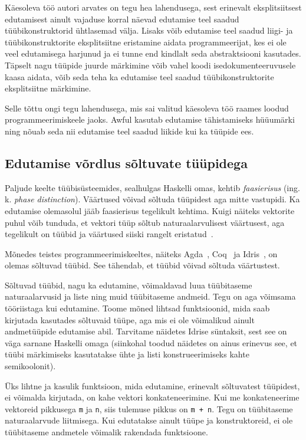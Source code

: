 \documentclass[12pt]{article}
\begin{document}
        Käesoleva töö autori arvates on tegu hea lahendusega, sest erinevalt eksplitsiitsest edutamisest ainult vajaduse korral näevad edutamise teel saadud tüübikonstruktorid ühtlasemad välja. Lisaks võib edutamise teel saadud liigi- ja tüübikonstruktorite eksplitsiitne eristamine aidata programmeerijat, kes ei ole veel edutamisega harjunud ja ei tunne end kindlalt seda abstraktsiooni kasutades. Täpselt nagu tüüpide juurde märkimine võib vahel koodi isedokumenteeruvusele kaasa aidata, võib seda teha ka edutamise teel saadud tüübikonstruktorite eksplitsiitne märkimine.

        Selle tõttu ongi tegu lahendusega, mis sai valitud käesoleva töö raames loodud programmeerimiskeele jaoks. Awful kasutab edutamise tähistamiseks hüüumärki ning nõuab seda nii edutamise teel saadud liikide kui ka tüüpide ees.
    \subsection{Edutamise võrdlus sõltuvate tüüpidega}\label{soltuvad}
      Paljude keelte tüübisüsteemides, sealhulgas Haskelli omas, kehtib \textit{faasierisus} (ing. k. \textit{phase distinction}). Väärtused võivad sõltuda tüüpidest aga mitte vastupidi. Ka edutamise olemasolul jääb faasierisus tegelikult kehtima. Kuigi näiteks vektorite puhul võib tunduda, et vektori tüüp sõltub naturaalarvulisest väärtusest, aga tegelikult on tüübid ja väärtused siiski rangelt eristatud~\cite{Giv}.

      Mõnedes teistes programmeerimiskeeltes, näiteks Agda~\cite{Agd}, Coq~\cite{The_Coq} ja Idris~\cite{The_Idr}, on olemas sõltuvad tüübid. See tähendab, et tüübid võivad sõltuda väärtustest.

      Sõltuvad tüübid, nagu ka edutamine, võimaldavad luua tüübitaseme naturaalarvusid ja liste ning muid tüübitaseme andmeid. Tegu on aga võimsama tööriistaga kui edutamine. Toome mõned lihtsad funktsioonid, mida saab kirjutada kasutades sõltuvaid tüüpe, aga mis ei ole võimalikud ainult andmetüüpide edutamise abil. Tarvitame näidetes Idrise süntaksit, sest see on väga sarnane Haskelli omaga (siinkohal toodud näidetes on ainus erinevus see, et tüübi märkimiseks kasutatakse ühte ja listi konstrueerimiseks kahte semikoolonit).

      Üks lihtne ja kasulik funktsioon, mida edutamine, erinevalt sõltuvatest tüüpidest, ei võimalda kirjutada, on kahe vektori konkateneerimine. Kui me konkateneerime vektoreid pikkusega \verb!m! ja \verb!n!, siis tulemuse pikkus on \verb!m + n!. Tegu on tüübitaseme naturaalarvude liitmisega. Kui edutatakse ainult tüüpe ja konstruktoreid, ei ole tüübitaseme andmetele võimalik rakendada funktsioone.
\end{document}
